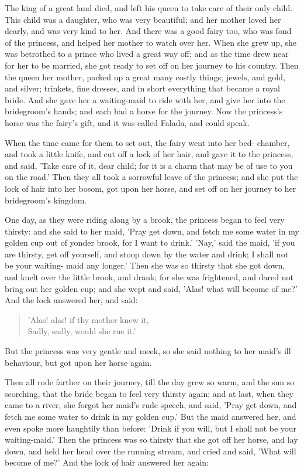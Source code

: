 \documentclass[12pt]{book}
\begin{document}
The king of a great land died, and left his queen to take care of
their only child. This child was a daughter, who was very beautiful;
and her mother loved her dearly, and was very kind to her. And there
was a good fairy too, who was fond of the princess, and helped her
mother to watch over her. When she grew up, she was betrothed to a
prince who lived a great way off; and as the time drew near for her to
be married, she got ready to set off on her journey to his country.
Then the queen her mother, packed up a great many costly things;
jewels, and gold, and silver; trinkets, fine dresses, and in short
everything that became a royal bride. And she gave her a waiting-maid
to ride with her, and give her into the bridegroom's hands; and each
had a horse for the journey. Now the princess's horse was the fairy's
gift, and it was called Falada, and could speak.

When the time came for them to set out, the fairy went into her bed-
chamber, and took a little knife, and cut off a lock of her hair, and
gave it to the princess, and said, 'Take care of it, dear child; for
it is a charm that may be of use to you on the road.' Then they all
took a sorrowful leave of the princess; and she put the lock of hair
into her bosom, got upon her horse, and set off on her journey to her
bridegroom's kingdom.

One day, as they were riding along by a brook, the princess began to
feel very thirsty: and she said to her maid, 'Pray get down, and fetch
me some water in my golden cup out of yonder brook, for I want to
drink.' 'Nay,' said the maid, 'if you are thirsty, get off yourself,
and stoop down by the water and drink; I shall not be your waiting-
maid any longer.' Then she was so thirsty that she got down, and knelt
over the little brook, and drank; for she was frightened, and dared
not bring out her golden cup; and she wept and said, 'Alas! what will
become of me?' And the lock answered her, and said:

\begin{verse}
 'Alas! alas! if thy mother knew it,\\
  Sadly, sadly, would she rue it.'
\end{verse}

But the princess was very gentle and meek, so she said nothing to her
maid's ill behaviour, but got upon her horse again.

Then all rode farther on their journey, till the day grew so warm, and
the sun so scorching, that the bride began to feel very thirsty again;
and at last, when they came to a river, she forgot her maid's rude
speech, and said, 'Pray get down, and fetch me some water to drink in
my golden cup.' But the maid answered her, and even spoke more
haughtily than before: 'Drink if you will, but I shall not be your
waiting-maid.' Then the princess was so thirsty that she got off her
horse, and lay down, and held her head over the running stream, and
cried and said, 'What will become of me?' And the lock of hair
answered her again:
\end{document}
